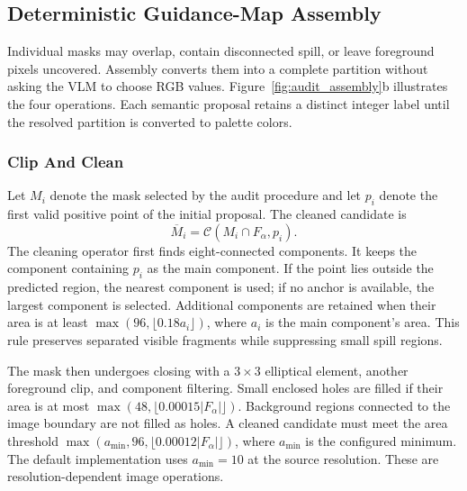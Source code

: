 \documentclass[pdflatex,iicol,sn-apa]{sn-jnl}
\begin{document}
\subsection{Deterministic Guidance-Map Assembly}
Individual masks may overlap, contain disconnected spill, or leave foreground pixels uncovered. Assembly converts them into a complete partition without asking the VLM to choose RGB values. Figure~\ref{fig:audit_assembly}b illustrates the four operations. Each semantic proposal retains a distinct integer label until the resolved partition is converted to palette colors.

\subsubsection{Clip And Clean}
Let $M_i$ denote the mask selected by the audit procedure and let $p_i$ denote the first valid positive point of the initial proposal. The cleaned candidate is
\begin{equation}
\overline M_i=\mathcal C(M_i\cap F_{\alpha},p_i).
\label{eq:clean}
\end{equation}
The cleaning operator first finds eight-connected components. It keeps the component containing $p_i$ as the main component. If the point lies outside the predicted region, the nearest component is used; if no anchor is available, the largest component is selected. Additional components are retained when their area is at least $\max(96,\lfloor0.18a_i\rfloor)$, where $a_i$ is the main component's area. This rule preserves separated visible fragments while suppressing small spill regions.

The mask then undergoes closing with a $3\times3$ elliptical element, another foreground clip, and component filtering. Small enclosed holes are filled if their area is at most $\max(48,\lfloor0.00015|F_{\alpha}|\rfloor)$. Background regions connected to the image boundary are not filled as holes. A cleaned candidate must meet the area threshold $\max(a_{\min},96,\lfloor0.00012|F_{\alpha}|\rfloor)$, where $a_{\min}$ is the configured minimum. The default implementation uses $a_{\min}=10$ at the source resolution. These are resolution-dependent image operations.
\end{document}
